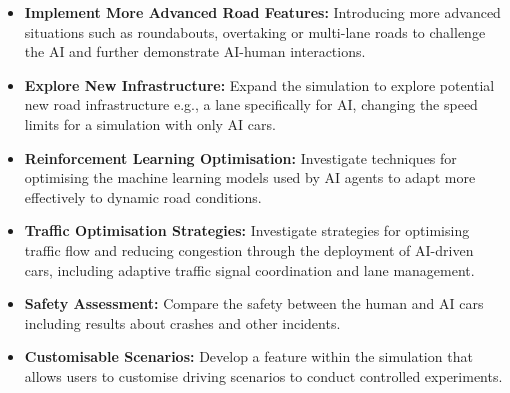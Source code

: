 \documentclass{article}
\begin{document}
\begin{itemize}

\item \textbf{Implement More Advanced Road Features:} Introducing more advanced situations such as roundabouts, overtaking or multi-lane roads to challenge the AI and further demonstrate AI-human interactions.

\item \textbf{Explore New Infrastructure:} Expand the simulation to explore potential new road infrastructure e.g., a lane specifically for AI, changing the speed limits for a simulation with only AI cars.

\item \textbf{Reinforcement Learning Optimisation:} Investigate techniques for optimising the machine learning models used by AI agents to adapt more effectively to dynamic road conditions.

\item \textbf{Traffic Optimisation Strategies:} Investigate strategies for optimising traffic flow and reducing congestion through the deployment of AI-driven cars, including adaptive traffic signal coordination and lane management.

\item \textbf{Safety Assessment:} Compare the safety between the human and AI cars including results about crashes and other incidents.

\item \textbf{Customisable Scenarios:} Develop a feature within the simulation that allows users to customise driving scenarios to conduct controlled experiments.

\end{itemize}

\newpage


 
\end{document}
